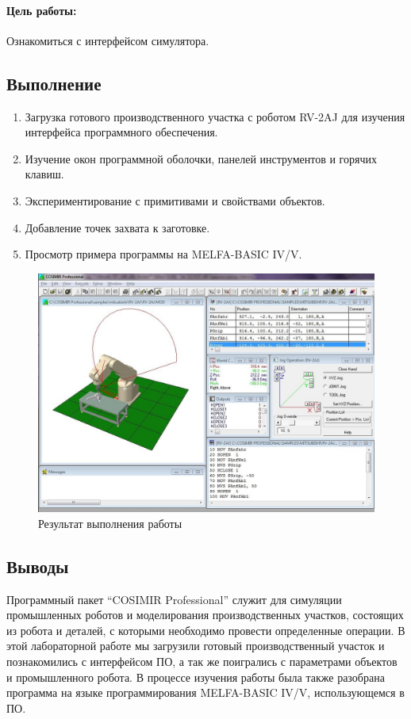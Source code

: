 \paragraph{Цель работы:} Ознакомиться с интерфейсом симулятора.

\subsection*{Выполнение}

\begin{enumerate}
	\item Загрузка готового производственного участка с роботом RV-2AJ для изучения интерфейса программного обеспечения.
	\item Изучение окон программной оболочки, панелей инструментов и горячих клавиш.
	\item Экспериментирование с примитивами и свойствами объектов.
	\item Добавление точек захвата к заготовке.
	\item Просмотр примера программы на MELFA-BASIC IV/V.
\end{enumerate}

\begin{figure}[ht]
\centering
	\includegraphics[scale=0.6]{1.png}
	\caption{Результат выполнения работы}
\end{figure}

\subsection*{Выводы}

Программный пакет ``COSIMIR Professional'' служит для симуляции промышленных роботов и моделирования производственных участков, состоящих из робота и деталей, с которыми необходимо провести определенные операции. В этой лабораторной работе мы загрузили готовый производственный участок и познакомились с интерфейсом ПО, а так же поигрались с параметрами объектов и промышленного робота. В процессе изучения работы была также разобрана программа на языке программирования MELFA-BASIC IV/V, использующемся в ПО.

\clearpage